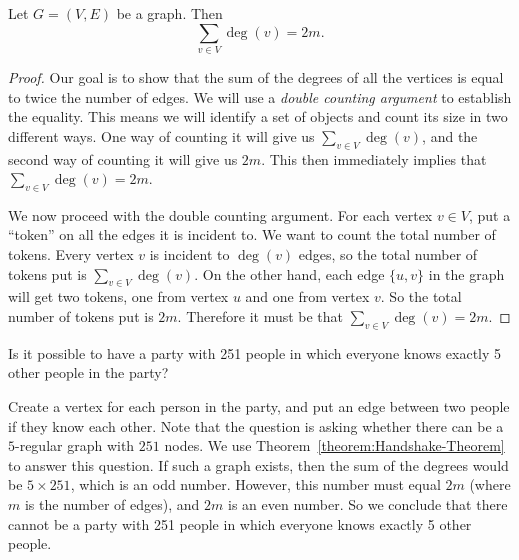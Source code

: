 \begin{flex}
\begin{theorem} \label{theorem:Handshake-Theorem}
Let $G=(V,E)$ be a graph. Then 
\[
\sum_{v \in V} \deg(v) = 2m.
\]
\end{theorem}

\begin{proof}
Our goal is to show that the sum of the degrees of all the vertices is equal to twice the number of edges. We will use a \emph{double counting argument} to establish the equality. This means we will identify a set of objects and count its size in two different ways. One way of counting it will give us $\sum_{v \in V} \deg(v)$, and the second way of counting it will give us $2m$. This then immediately implies that $\sum_{v \in V} \deg(v) = 2m$.

We now proceed with the double counting argument. For each vertex $v \in V$, put a ``token'' on all the edges it is incident to. We want to count the total number of tokens. Every vertex $v$ is incident to $\deg(v)$ edges, so the total number of tokens put is $\sum_{v \in V} \deg(v)$. On the other hand, each edge $\{u,v\}$ in the graph will get two tokens, one from vertex $u$ and one from vertex $v$. So the total number of tokens put is $2m$. Therefore it must be that $\sum_{v \in V} \deg(v) = 2m$.
\end{proof}
\end{flex}


\begin{flex}
\begin{exercise} \label{exercise:Application-of-Handshake-Theorem}
Is it possible to have a party with 251 people in which everyone knows exactly 5 other people in the party?
\end{exercise}

\begin{solution}
Create a vertex for each person in the party, and put an edge between two people if they know each other. Note that the question is asking whether there can be a $5$-regular graph with $251$ nodes. We use Theorem~\ref{theorem:Handshake-Theorem} to answer this question. If such a graph exists, then the sum of the degrees would be $5 \times 251$, which is an odd number. However, this number must equal $2m$ (where $m$ is the number of edges), and $2m$ is an even number. So we conclude that there cannot be a party with 251 people in which everyone knows exactly 5 other people.
\end{solution}
\end{flex}


